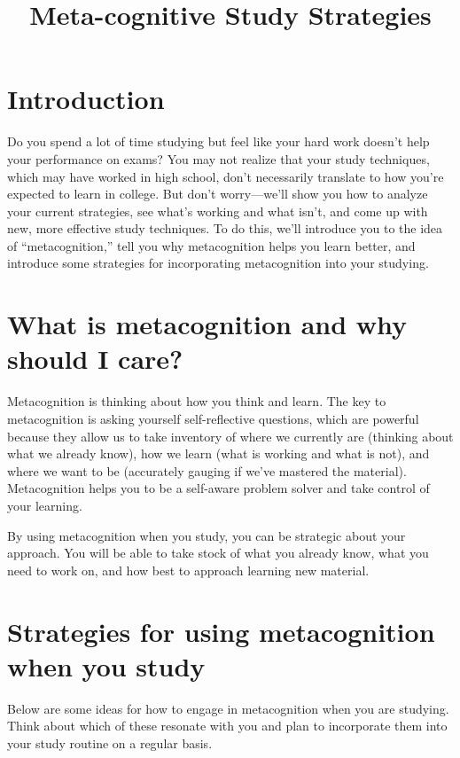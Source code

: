 \documentclass[../main.tex]{subfiles}
\title{Meta-cognitive Study Strategies}
\begin{document}
\maketitle
%
\section{Introduction}
Do you spend a lot of time studying but feel like your hard work doesn't help
your performance on exams? You may not realize that your study techniques, which
may have worked in high school, don't necessarily translate to how you're
expected to learn in college. But don't worry—we'll show you how to analyze your
current strategies, see what's working and what isn't, and come up with new,
more effective study techniques. To do this, we'll introduce you to the idea of
“metacognition,” tell you why metacognition helps you learn better, and
introduce some strategies for incorporating metacognition into your studying.
%
\section{What is metacognition and why should I care?}
Metacognition is thinking about how you think and learn. The key to
metacognition is asking yourself self-reflective questions, which are powerful
because they allow us to take inventory of where we currently are (thinking
about what we already know), how we learn (what is working and what is not), and
where we want to be (accurately gauging if we've mastered the material).
Metacognition helps you to be a self-aware problem solver and take control of
your learning.

By using metacognition when you study, you can be strategic about your approach.
You will be able to take stock of what you already know, what you need to work
on, and how best to approach learning new material.
%
\section{Strategies for using metacognition when you study}
Below are some ideas for how to engage in metacognition when you are studying.
Think about which of these resonate with you and plan to incorporate them into
your study routine on a regular basis.
\\
\end{document}
